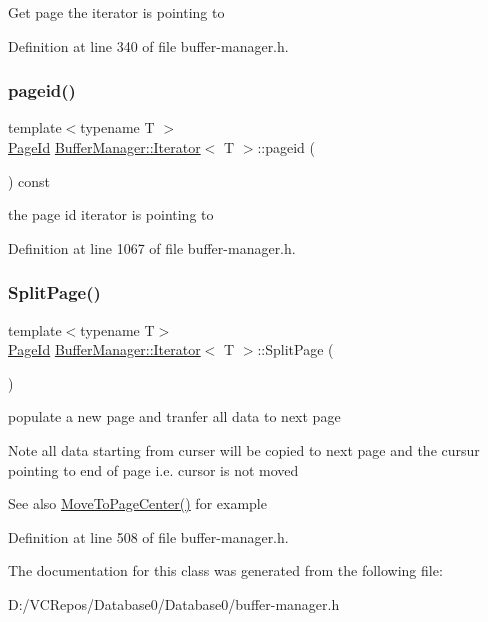 Get page the iterator is pointing to 

Definition at line 340 of file buffer-\/manager.\+h.

\mbox{\label{class_buffer_manager_1_1_iterator_a7a57002c7f8daa714cf9e19e34874fca}} 
\subsubsection{\texorpdfstring{pageid()}{pageid()}}
{\footnotesize\ttfamily template$<$typename T $>$ \\
\mbox{\hyperlink{struct_generic_i_o_id}{Page\+Id}} \mbox{\hyperlink{class_buffer_manager_1_1_iterator}{Buffer\+Manager\+::\+Iterator}}$<$ T $>$\+::pageid (\begin{DoxyParamCaption}{ }\end{DoxyParamCaption}) const\hspace{0.3cm}{\ttfamily [inline]}}

the page id iterator is pointing to 

Definition at line 1067 of file buffer-\/manager.\+h.

\mbox{\label{class_buffer_manager_1_1_iterator_a18f31d37240c5a587a85042374c5272d}} 
\subsubsection{\texorpdfstring{SplitPage()}{SplitPage()}}
{\footnotesize\ttfamily template$<$typename T$>$ \\
\mbox{\hyperlink{struct_generic_i_o_id}{Page\+Id}} \mbox{\hyperlink{class_buffer_manager_1_1_iterator}{Buffer\+Manager\+::\+Iterator}}$<$ T $>$\+::Split\+Page (\begin{DoxyParamCaption}{ }\end{DoxyParamCaption})\hspace{0.3cm}{\ttfamily [inline]}}

populate a new page and tranfer all data to next page \begin{DoxyNote}{Note}
all data starting from curser will be copied to next page and the cursur pointing to end of page i.\+e. cursor is not moved 
\end{DoxyNote}
\begin{DoxySeeAlso}{See also}
\mbox{\hyperlink{class_buffer_manager_1_1_iterator_a20b703d6135c5e3026eab944a32ca186}{Move\+To\+Page\+Center()}} for example 
\end{DoxySeeAlso}


Definition at line 508 of file buffer-\/manager.\+h.



The documentation for this class was generated from the following file\+:\begin{DoxyCompactItemize}
\item 
D\+:/\+V\+C\+Repos/\+Database0/\+Database0/buffer-\/manager.\+h\end{DoxyCompactItemize}
